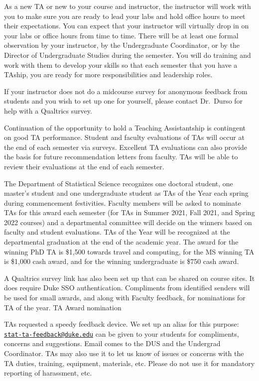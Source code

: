 \documentclass[
]{article}
\begin{document}
As a new TA or new to your course and instructor, the instructor will work with you to make sure you are ready to lead your labs and hold office hours to meet their expectations. You can expect that your instructor will virtually drop in on your labs or office hours from time to time. There will be at least one formal observation by your instructor, by the Undergraduate Coordinator, or by the Director of Undergraduate Studies during the semester. You will do training and work with them to develop your skills so that each semester that you have a TAship, you are ready for more responsibilities and leadership roles.

If your instructor does not do a midcourse survey for anonymous feedback from students and you wish to set up one for yourself, please contact Dr.~Durso for help with a Qualtrics survey.

Continuation of the opportunity to hold a Teaching Assistantship is contingent on good TA performance. Student and faculty evaluations of TAs will occur at the end of each semester via surveys. Excellent TA evaluations can also provide the basis for future recommendation letters from faculty. TAs will be able to review their evaluations at the end of each semester.

The Department of Statistical Science recognizes one doctoral student, one master's student and one undergraduate student as TAs of the Year each spring during commencement festivities. Faculty members will be asked to nominate TAs for this award each semester (for TAs in Summer 2021, Fall 2021, and Spring 2022 courses) and a departmental committee will decide on the winners based on faculty and student evaluations. TAs of the Year will be recognized at the departmental graduation at the end of the academic year. The award for the winning PhD TA is \$1,500 towards travel and computing, for the MS winning TA is \$1,000 cash award, and for the winning undergraduate is \$750 cash award.

A Qualtrics survey link has also been set up that can be shared on course sites. It does require Duke SSO authentication. Compliments from identified senders will be used for small awards, and along with Faculty feedback, for nominations for TA of the year. TA Award nomination

TAs requested a speedy feedback device. We set up an alias for this purpose: \href{mailto:stat-ta-feedback@duke.edu}{\nolinkurl{stat-ta-feedback@duke.edu}} can be given to your students for compliments, concerns and suggestions. Email comes to the DUS and the Undergrad Coordinator. TAs may also use it to let us know of issues or concerns with the TA duties, training, equipment, materials, etc. Please do not use it for mandatory reporting of harassment, etc.
\end{document}
